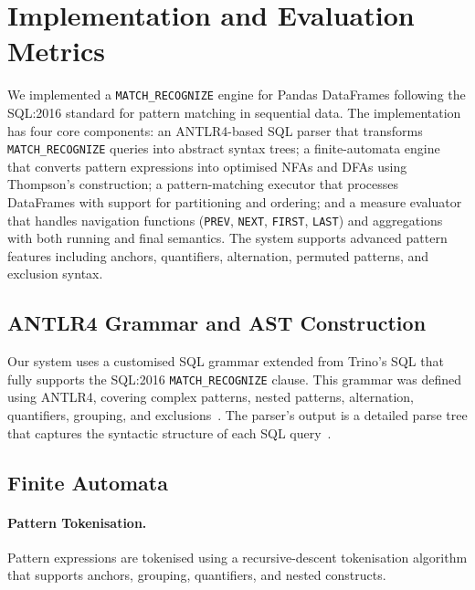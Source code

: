 \section{Implementation and Evaluation Metrics}
\label{sec:meth-impl}

We implemented a \texttt{MATCH\_RECOGNIZE} engine for Pandas
DataFrames following the SQL:2016 standard for pattern matching in
sequential data.  The implementation has four core components: an
ANTLR4-based SQL parser that transforms \texttt{MATCH\_RECOGNIZE}
queries into abstract syntax trees; a finite-automata engine that
converts pattern expressions into optimised NFAs and DFAs using
Thompson's construction; a pattern-matching executor that processes
DataFrames with support for partitioning and ordering; and a measure
evaluator that handles navigation functions (\texttt{PREV},
\texttt{NEXT}, \texttt{FIRST}, \texttt{LAST}) and aggregations with
both running and final semantics.  The system supports advanced
pattern features including anchors, quantifiers, alternation,
permuted patterns, and exclusion syntax.

\subsection{ANTLR4 Grammar and AST Construction}
\label{subsec:impl-antlr4}

Our system uses a customised SQL grammar extended from Trino's SQL
that fully supports the SQL:2016 \texttt{MATCH\_RECOGNIZE} clause.
This grammar was defined using ANTLR4, covering complex patterns,
nested patterns, alternation, quantifiers, grouping, and
exclusions~\cite{antlr_trino_sql}.  The parser's output is a
detailed parse tree that captures the syntactic structure of each
SQL query~\cite{parr2013definitive,tarazona2021antlr}.

\subsection{Finite Automata}
\label{subsec:impl-automata}

\paragraph{Pattern Tokenisation.}
Pattern expressions are tokenised using a recursive-descent
tokenisation algorithm that supports anchors, grouping,
quantifiers, and nested constructs.

